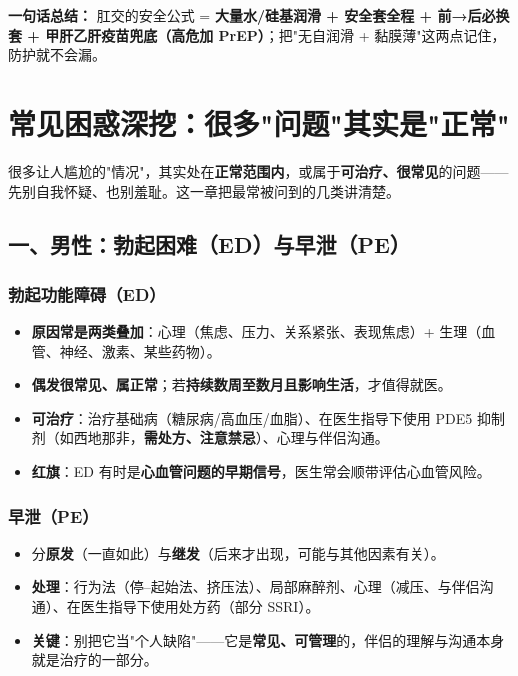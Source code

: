 \vspace{1em}
\noindent\textbf{一句话总结：} 肛交的安全公式 = \textbf{大量水/硅基润滑 + 安全套全程 + 前→后必换套 + 甲肝乙肝疫苗兜底（高危加 PrEP）}；把"无自润滑 + 黏膜薄"这两点记住，防护就不会漏。

\chapter{常见困惑深挖：很多"问题"其实是"正常"}
\label{chap:concerns}

很多让人尴尬的"情况"，其实处在\textbf{正常范围内}，或属于\textbf{可治疗、很常见}的问题——先别自我怀疑、也别羞耻。这一章把最常被问到的几类讲清楚。

\section{一、男性：勃起困难（ED）与早泄（PE）}

\subsection*{勃起功能障碍（ED）}
\begin{itemize}[leftmargin=2em,itemsep=0.3em]
  \item \textbf{原因常是两类叠加}：心理（焦虑、压力、关系紧张、表现焦虑）+ 生理（血管、神经、激素、某些药物）。
  \item \textbf{偶发很常见、属正常}；若\textbf{持续数周至数月且影响生活}，才值得就医。
  \item \textbf{可治疗}：治疗基础病（糖尿病/高血压/血脂）、在医生指导下使用 PDE5 抑制剂（如西地那非，\textbf{需处方、注意禁忌}）、心理与伴侣沟通。
  \item \textbf{红旗}：ED 有时是\textbf{心血管问题的早期信号}，医生常会顺带评估心血管风险。
\end{itemize}

\subsection*{早泄（PE）}
\begin{itemize}[leftmargin=2em,itemsep=0.3em]
  \item 分\textbf{原发}（一直如此）与\textbf{继发}（后来才出现，可能与其他因素有关）。
  \item \textbf{处理}：行为法（停--起始法、挤压法）、局部麻醉剂、心理（减压、与伴侣沟通）、在医生指导下使用处方药（部分 SSRI）。
  \item \textbf{关键}：别把它当"个人缺陷"——它是\textbf{常见、可管理}的，伴侣的理解与沟通本身就是治疗的一部分。
\end{itemize}

